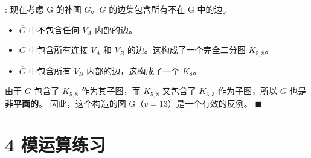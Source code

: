\documentclass[11pt]{article}
\newenvironment{qparts}{\begin{enumerate}[{(}a{)}]}{\end{enumerate}}
\def\endproofmark{$\blacksquare$}
\newenvironment{proof}{\par\noindent{\bf 证明}:}{\endproofmark\smallskip}
\begin{document}
\begin{qparts}
\begin{proof}
现在考虑 G 的补图 $\overline{G}$。$\overline{G}$ 的边集包含所有不在 G 中的边。
\begin{itemize}
    \item $\overline{G}$ 中不包含任何 $V_A$ 内部的边。
    \item $\overline{G}$ 中包含所有连接 $V_A$ 和 $V_B$ 的边。这构成了一个完全二分图 $K_{5,8}$。
    \item $\overline{G}$ 中包含所有 $V_B$ 内部的边，这构成了一个 $K_8$。
\end{itemize}
由于 $\overline{G}$ 包含了 $K_{5,8}$ 作为其子图，而 $K_{5,8}$ 又包含了 $K_{3,3}$ 作为子图，所以 $\overline{G}$ 也是\textbf{非平面的}。
因此，这个构造的图 G（$v=13$）是一个有效的反例。
\end{proof}
\end{qparts}

\section*{4 模运算练习}
\end{document}
